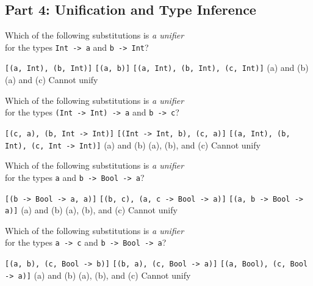 \documentclass[addpoints]{exam}
\begin{document}
\begin{questions}
\begin{parts}
\end{parts}

\subsection*{\textbf{Part 4: Unification and Type Inference}}

\question[3] Which of the following substitutions is \emph{a unifier} \\ for the types \texttt{Int -> a} and \texttt{b -> Int}?

\begin{choices}
  \choice \texttt{[(a, Int), (b, Int)]}
  \choice \texttt{[(a, b)]}
  \choice \texttt{[(a, Int), (b, Int), (c, Int)]}
  \choice (a) and (b)
  \CorrectChoice (a) and (c)
  \choice Cannot unify
\end{choices}

\question[3] Which of the following substitutions is \emph{a unifier} \\ for the types \texttt{(Int -> Int) -> a} and \texttt{b -> c}?

\begin{choices}
  \CorrectChoice \texttt{[(c, a), (b, Int -> Int)]}
  \choice \texttt{[(Int -> Int, b), (c, a)]}
  \choice \texttt{[(a, Int), (b, Int), (c, Int -> Int)]}
  \choice (a) and (b)
  \choice (a), (b), and (c)
  \choice Cannot unify
\end{choices}

\question[3] Which of the following substitutions is \emph{a unifier} \\ for the types \texttt{a} and \texttt{b -> Bool -> a}?

\begin{choices}
  \choice \texttt{[(b -> Bool -> a, a)]}
  \choice \texttt{[(b, c), (a, c -> Bool -> a)]}
  \choice \texttt{[(a, b -> Bool -> a)]}
  \choice (a) and (b)
  \choice (a), (b), and (c)
  \CorrectChoice Cannot unify
\end{choices}

\question[3] Which of the following substitutions is \emph{a unifier} \\ for the types \texttt{a -> c} and \texttt{b -> Bool -> a}?

\begin{choices}
  \choice \texttt{[(a, b), (c, Bool -> b)]}
  \choice \texttt{[(b, a), (c, Bool -> a)]}
  \choice \texttt{[(a, Bool), (c, Bool -> a)]}
  \CorrectChoice (a) and (b)
  \choice (a), (b), and (c)
  \choice Cannot unify
\end{choices}


\end{questions}
\end{document}

